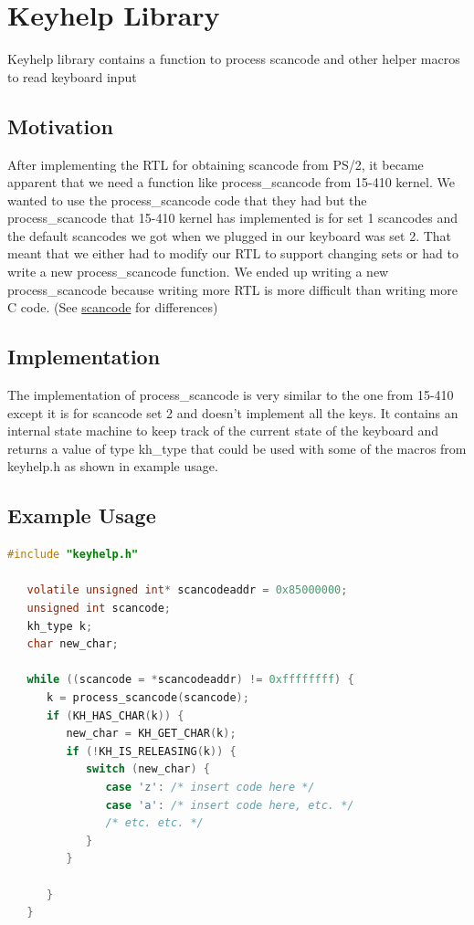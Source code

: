 \documentclass[10pt]{article}
\begin{document}
\section{Keyhelp Library}

\label{sec:keyhelp}

Keyhelp library contains a function to process scancode and other helper macros to read keyboard input

\subsection{Motivation}

After implementing the RTL for obtaining scancode from PS/2, it became apparent that we need a function like process\_scancode from 15-410 kernel. We wanted to use the process\_scancode code that they had but the process\_scancode that 15-410 kernel has implemented is for set 1 scancodes and the default scancodes we got when we plugged in our keyboard was set 2. That meant that we either had to modify our RTL to support changing sets or had to write a new process\_scancode function. We ended up writing a new process\_scancode because writing more RTL is more difficult than writing more C code. (See \href{http://en.wikipedia.org/wiki/Scancode}{scancode} for differences) 

\subsection{Implementation}

The implementation of process\_scancode is very similar to the one from 15-410 except it is for scancode set 2 and doesn't implement all the keys. It contains an internal state machine to keep track of the current state of the keyboard and returns a value of type kh\_type that could be used with some of the macros from keyhelp.h as shown in example usage.

\subsection{Example Usage}

\begin{lstlisting}[basicstyle=\footnotesize,language=C]
   #include "keyhelp.h"
 
   volatile unsigned int* scancodeaddr = 0x85000000;
   unsigned int scancode;
   kh_type k;
   char new_char;
 
   while ((scancode = *scancodeaddr) != 0xffffffff) {
      k = process_scancode(scancode);
      if (KH_HAS_CHAR(k)) {
         new_char = KH_GET_CHAR(k);
         if (!KH_IS_RELEASING(k)) {
            switch (new_char) {
               case 'z': /* insert code here */
               case 'a': /* insert code here, etc. */ 
               /* etc. etc. */
            }
         }
 
      }
   }
\end{lstlisting}
\end{document}
